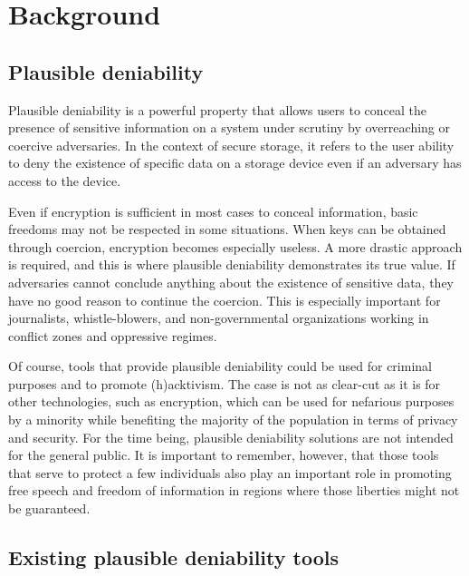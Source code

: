 \documentclass[a4paper,11pt,oneside]{report}
\begin{document}
\let\clearpage\relax

\chapter{Background}

\section{Plausible deniability}

Plausible deniability is a powerful property that allows users to conceal the presence of sensitive information on a system under scrutiny by overreaching or coercive adversaries. In the context of secure storage, it refers to the user ability to deny the existence of specific data on a storage device even if an adversary has access to the device\cite{DBLP:journals/corr/abs-2111-12809}.

Even if encryption is sufficient in most cases to conceal information, basic freedoms may not be respected in some situations. When keys can be obtained through coercion, encryption becomes especially useless. A more drastic approach is required, and this is where plausible deniability demonstrates its true value. If adversaries cannot conclude anything about the existence of sensitive data, they have no good reason to continue the coercion\cite{DBLP:journals/corr/abs-2111-12809}. This is especially important for journalists, whistle-blowers, and non-governmental organizations working in conflict zones and oppressive regimes\cite{000213012}.

Of course, tools that provide plausible deniability could be used for criminal purposes and to promote (h)acktivism\cite{000213012}. The case is not as clear-cut as it is for other technologies, such as encryption, which can be used for nefarious purposes by a minority while benefiting the majority of the population in terms of privacy and security. For the time being, plausible deniability solutions are not intended for the general public. It is important to remember, however, that those tools that serve to protect a few individuals also play an important role in promoting free speech and freedom of information in regions where those liberties might not be guaranteed.

\section{Existing plausible deniability tools}
\end{document}
